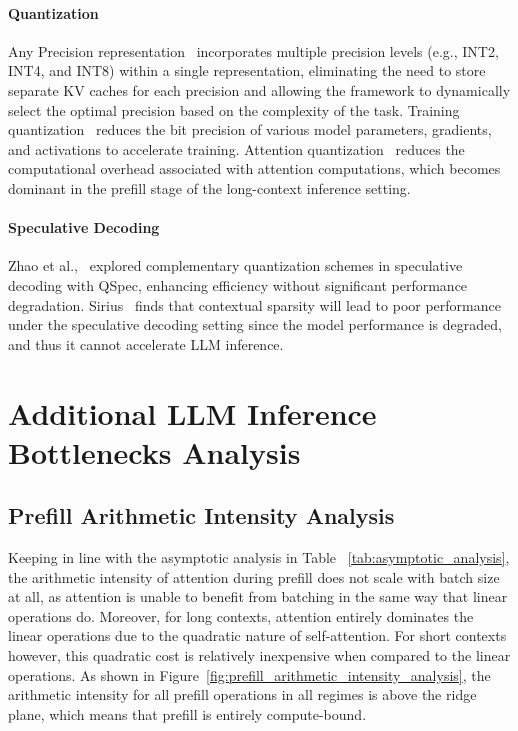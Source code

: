 \paragraph{Quantization} Any Precision representation~\cite{park2024any} incorporates multiple precision levels (e.g., INT2, INT4, and INT8) within a single representation, eliminating the need to store separate KV caches for each precision and allowing the framework to dynamically select the optimal precision based on the complexity of the task. Training quantization~\cite{peng2023fp8,xi2024jetfire,fishman2024fp8trillion,xi2024coatcompressingoptimizerstates} reduces the bit precision of various model parameters, gradients, and activations to accelerate training.
Attention quantization~\cite{chen2024int8attn,zhang2024sageattention,shah2024flashattention3} reduces the computational overhead associated with attention computations, which becomes dominant in the prefill stage of the long-context inference setting.

\paragraph{Speculative Decoding} Zhao et al.,~\cite{zhao2024qspec} explored complementary quantization schemes in speculative decoding with QSpec, enhancing efficiency without significant performance degradation. 
Sirius~\cite{zhou2024sirius} finds that contextual sparsity will lead to poor performance under the speculative decoding setting since the model performance is degraded, and thus it cannot accelerate LLM inference.

\section{Additional LLM Inference Bottlenecks Analysis}
\label{appendix:appendix_inference_bottlenecks_analysis}
\subsection{Prefill Arithmetic Intensity Analysis}
\label{appendix:prefill_ai_analysis}

Keeping in line with the asymptotic analysis in Table ~\ref{tab:asymptotic_analysis}, the arithmetic intensity of attention during prefill does not scale with batch size at all, as attention is unable to benefit from batching in the same way that linear operations do. Moreover, for long contexts, attention entirely dominates the linear operations due to the quadratic nature of self-attention. For short contexts however, this quadratic cost is relatively inexpensive when compared to the linear operations. As shown in Figure~\ref{fig:prefill_arithmetic_intensity_analysis}, the arithmetic intensity for all prefill operations in all regimes is above the ridge plane, which means that prefill is entirely compute-bound.

